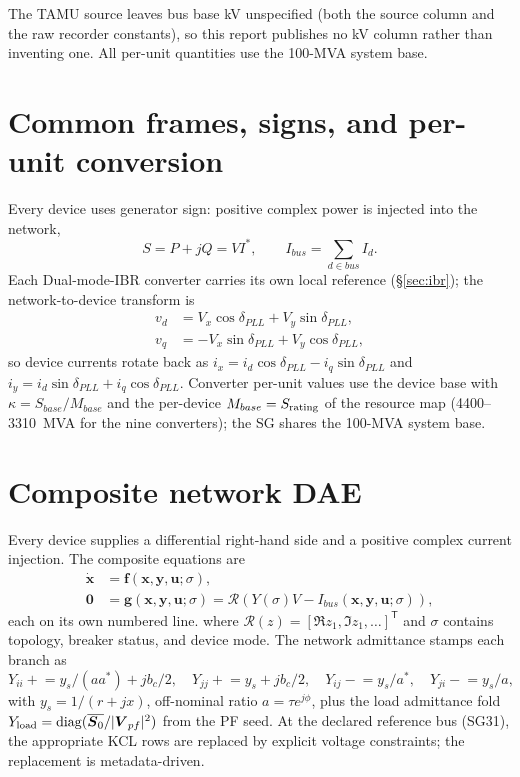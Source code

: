 \documentclass[12pt,a4paper]{article}
\newcommand{\vect}[1]{\boldsymbol{#1}}
\begin{document}
The TAMU source leaves bus base kV unspecified (both the source column and
the raw recorder constants), so this report publishes no kV column rather than
inventing one.  All per-unit quantities use the 100-MVA system base.

\section{Common frames, signs, and per-unit conversion}

Every device uses generator sign: positive complex power is injected into the
network,
\[
S=P+jQ=V I^*,\qquad I_{bus}=\sum_{d\in bus} I_d.
\]
Each Dual-mode-IBR converter carries its own local reference (\S\ref{sec:ibr}); the
network-to-device transform is
\begin{align}
v_d&=V_x\cos\delta_{PLL}+V_y\sin\delta_{PLL},\\
v_q&=-V_x\sin\delta_{PLL}+V_y\cos\delta_{PLL},
\end{align}
so device currents rotate back as
$i_x=i_d\cos\delta_{PLL}-i_q\sin\delta_{PLL}$ and
$i_y=i_d\sin\delta_{PLL}+i_q\cos\delta_{PLL}$.  Converter per-unit values use
the device base with $\kappa=S_{base}/M_{base}$ and the per-device
$M_{base}=S_{\rm rating}$ of the resource map (4400--3310~MVA for the nine
converters); the SG shares the 100-MVA system base.

\section{Composite network DAE}

Every device supplies a differential right-hand side and a positive complex
current injection.  The composite equations are
\begin{align}
\dot{\vect x}&=\vect f(\vect x,\vect y,\vect u;\sigma),\\
\vect 0&=\vect g(\vect x,\vect y,\vect u;\sigma)
          =\mathcal R\!\left(Y(\sigma)V-I_{bus}(\vect x,\vect y,\vect u;\sigma)\right),
\end{align}
each on its own numbered line.
where $\mathcal R(z)=[\Re z_1,\Im z_1,\ldots]^{\mathsf T}$ and $\sigma$
contains topology, breaker status, and device mode.  The network admittance
stamps each branch as
\[
Y_{ii}\mathrel{+}=y_s/(a a^*)+jb_c/2,\quad
Y_{jj}\mathrel{+}=y_s+jb_c/2,\quad
Y_{ij}\mathrel{-}=y_s/a^*,\quad
Y_{ji}\mathrel{-}=y_s/a,
\]
with $y_s=1/(r+jx)$, off-nominal ratio $a=\tau e^{j\phi}$, plus the load
admittance fold $Y_{\rm load}=\operatorname{diag}(\overline{\vect S_0}/|\vect V_{pf}|^2)$
from the PF seed.  At the declared reference bus (SG31), the appropriate KCL
rows are replaced by explicit voltage constraints; the replacement is
metadata-driven.
\end{document}
